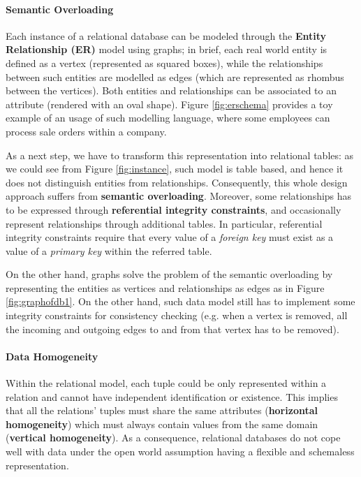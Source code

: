 \paragraph*{Semantic Overloading}\label{subsec:semanticoverloadrel}
Each instance of a relational database can be modeled through the \textbf{Entity Relationship (ER)} model  \cite{Chen1976} using graphs; in brief, each real world entity is defined as a vertex (represented as squared boxes), while the relationships between such entities are modelled as edges (which are represented as rhombus between the vertices). Both entities and relationships can be associated to an attribute (rendered with an oval shape). Figure \ref{fig:erschema} provides a toy example of an usage of such modelling language, where some employees can process sale orders within a company. 

As a next step, we have to transform this representation into relational tables: as we could see from Figure \ref{fig:instance}, such model is table based, and hence it does not distinguish  entities from relationships. Consequently, this whole design approach suffers from \textbf{semantic overloading}. Moreover, some relationships has to be expressed through \textbf{referential integrity constraints}, and occasionally represent relationships through additional tables. In particular, {referential integrity constraints} require that every value of a \textit{foreign key} must exist as a value of a \textit{primary key} within the referred table. 

On the other hand, graphs solve the problem of the semantic overloading by representing the entities as vertices and relationships as edges as in Figure \ref{fig:graphofdb1}. On the other hand, such data model still has to implement some integrity constraints for consistency checking (e.g. when a vertex is removed, all the incoming and outgoing edges to and from that vertex has to be removed).

\paragraph*{Data Homogeneity}\label{par:homog}
Within the relational model, each tuple could be only represented within a relation and cannot have independent identification or existence. This  implies that all the relations' tuples must share the same attributes (\textbf{horizontal homogeneity}) which must always contain values from the same domain (\textbf{vertical homogeneity}). As a consequence, relational databases do not cope well with data under the open world assumption having a flexible and schemaless representation. 

